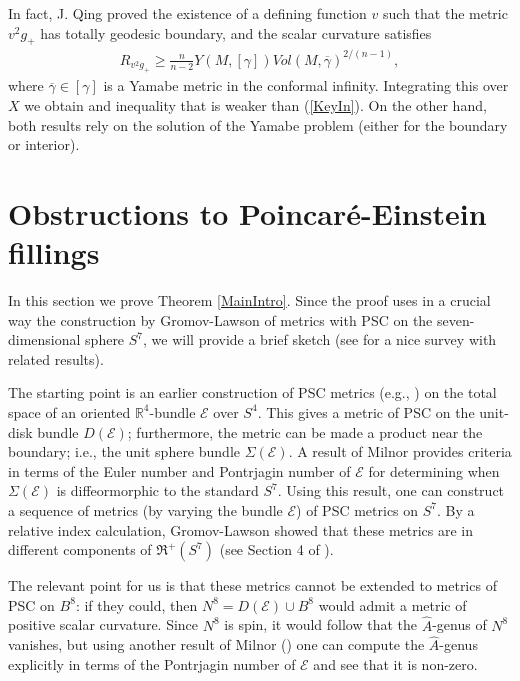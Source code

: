 \documentclass{amsart}
\theoremstyle{definition}
\theoremstyle{remark}
\numberwithin{equation}{section}
\begin{document}
In fact, J. Qing proved the existence of a defining function $v$ such that the metric $v^2 g_{+}$ has totally geodesic boundary, and the scalar curvature satisfies
\begin{align*}
R_{v^2 g_{+}} \geq \frac{n}{n-2} Y(M, [\gamma]) Vol(M,\overline{\gamma})^{2/(n-1)},
\end{align*}
where $\overline{\gamma} \in [\gamma]$ is a Yamabe metric in the conformal infinity.  Integrating this over $X$ we obtain and inequality that is weaker than (\ref{KeyIn}).  On the
other hand, both results rely on the solution of the Yamabe problem (either for the boundary or interior).


\section{Obstructions to Poincar\'e-Einstein fillings} \label{CorSec}

In this section we prove Theorem \ref{MainIntro}.  Since the proof uses in a crucial way the construction by Gromov-Lawson \cite{GL} of metrics with PSC on the seven-dimensional sphere $S^7$, we will provide a brief sketch (see \cite{Rosenberg} for a nice survey with related results).

The starting point is an earlier construction of PSC metrics (e.g., \cite{GL2}) on the total space of an oriented $\mathbb{R}^4$-bundle $\mathcal{E}$ over $S^4$.  This gives a metric of PSC on the unit-disk bundle $D(\mathcal{E})$; furthermore, the metric can be made a product near the boundary; i.e., the unit sphere bundle $\Sigma(\mathcal{E})$.  A result of Milnor \cite{M1} provides criteria in terms of the Euler number and Pontrjagin number of $\mathcal{E}$ for determining when $\Sigma(\mathcal{E})$ is diffeormorphic to the standard $S^7$.  Using this result, one can construct a sequence of metrics (by varying the bundle $\mathcal{E}$) of PSC metrics on $S^7$.  By a relative index calculation, Gromov-Lawson showed that these metrics are in different components of $\mathfrak{R}^{+}(S^7)$ (see Section 4 of \cite{GL}).

The relevant point for us is that these metrics cannot be extended to metrics of PSC on $B^8$: if they could, then $N^8 = D(\mathcal{E}) \cup B^8$ would admit a metric of positive scalar curvature.  Since $N^8$ is spin, it would follow that the $\widehat{A}$-genus of $N^8$ vanishes, but using another result of Milnor (\cite{M2}) one can compute the $\widehat{A}$-genus explicitly in terms of the Pontrjagin number of $\mathcal{E}$ and see that it is non-zero.
\end{document}
